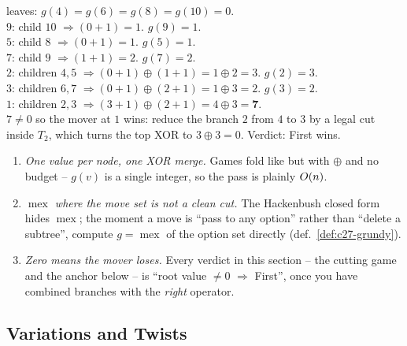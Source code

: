 \begin{tracebox}[Bottom-up Grundy fold on $T$ ($g(v) = \bigoplus_c (g(c)+1)$)]
leaves: $g(4)=g(6)=g(8)=g(10)=0$.\\
$9$: child $10$ $\Rightarrow (0+1)=1$. \;\;$g(9)=1$.\\
$5$: child $8$ $\Rightarrow (0+1)=1$. \;\;$g(5)=1$.\\
$7$: child $9$ $\Rightarrow (1+1)=2$. \;\;$g(7)=2$.\\
$2$: children $4,5$ $\Rightarrow (0+1)\oplus(1+1)=1\oplus2=3$. \;\;$g(2)=3$.\\
$3$: children $6,7$ $\Rightarrow (0+1)\oplus(2+1)=1\oplus3=2$. \;\;$g(3)=2$.\\
$1$: children $2,3$ $\Rightarrow (3+1)\oplus(2+1)=4\oplus3=\mathbf{7}$. \checkmark\\
$7 \ne 0$ so the mover at $1$ wins: reduce the branch $2$ from $4$ to $3$ by a legal
cut inside $T_2$, which turns the top XOR to $3 \oplus 3 = 0$. \;\;Verdict: First wins.
\end{tracebox}

\begin{insightbox}
\begin{enumerate}[nosep, leftmargin=1.6em]
  \item \emph{One value per node, one XOR merge.} Games fold like 
        but with $\oplus$ and no budget -- $g(v)$ is a single integer, so the pass is
        plainly $O(n)$.
  \item \emph{$\operatorname{mex}$ where the move set is not a clean cut.} The Hackenbush closed form
        hides $\operatorname{mex}$; the moment a move is ``pass to any option'' rather than ``delete a
        subtree'', compute $g = \operatorname{mex}$ of the option set directly (def.~\ref{def:c27-grundy}).
  \item \emph{Zero means the mover loses.} Every verdict in this section -- the cutting
        game and the anchor below -- is ``root value $\ne 0$ $\Rightarrow$ First'', once you
        have combined branches with the \emph{right} operator.
\end{enumerate}
\end{insightbox}

\subsection{Variations and Twists}

